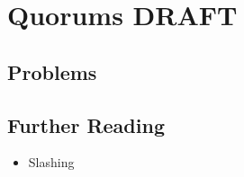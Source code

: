 \chapter{Quorums \small{\textsf{DRAFT}}}\label{chapter.quorums}

\section*{Problems}

\section*{Further Reading}

{\color{red}
\begin{itemize}
\item Slashing
\end{itemize}
}
